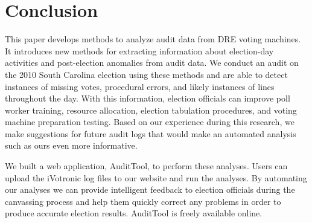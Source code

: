 \documentclass[letterpaper,twocolumn,10pt]{article}
\begin{document}
\section{Conclusion}
This paper develops methods to analyze audit data from DRE voting machines. It 
introduces new methods for extracting information about election-day activities
and post-election anomalies from audit data.  We conduct an audit on the 2010 South Carolina 
election using these methods and are able to detect instances of missing votes,
procedural errors, and likely instances of lines throughout the day. With this
information, election officials can improve poll worker 
training, resource allocation, election tabulation procedures, and 
voting machine preparation testing. Based on our experience during this
research, we make suggestions for future audit logs that would make an automated
analysis such as ours even more informative.
 
We built a web application, AuditTool, to perform these analyses. Users can
upload the iVotronic log files to our website and run the analyses. By automating our
analyses we can provide intelligent feedback to election officials during the
canvassing process and help them quickly correct any problems in order to
produce accurate election results. AuditTool is freely available online.  
 


{\footnotesize 
}


\end{document}

